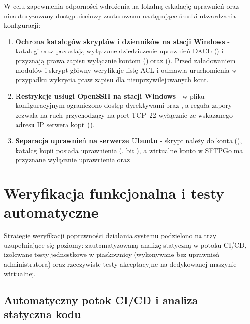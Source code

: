W celu zapewnienia odporności wdrożenia na lokalną eskalację uprawnień oraz nieautoryzowany dostęp sieciowy zastosowano następujące środki utwardzania konfiguracji:
\begin{enumerate}
    \item \textbf{Ochrona katalogów skryptów i dzienników na stacji Windows} - katalogi  oraz  posiadają wyłączone dziedziczenie uprawnień DACL () i przyznają prawa zapisu wyłącznie kontom  () oraz  (). Przed załadowaniem modułów  i  skrypt główny weryfikuje listę ACL i odmawia uruchomienia w przypadku wykrycia praw zapisu dla nieuprzywilejowanych kont.
    \item \textbf{Restrykcje usługi OpenSSH na stacji Windows} - w pliku konfiguracyjnym  ograniczono dostęp dyrektywami  oraz , a reguła zapory  zezwala na ruch przychodzący na port TCP~22 wyłącznie ze wskazanego adresu IP serwera kopii ().
    \item \textbf{Separacja uprawnień na serwerze Ubuntu} - skrypt  należy do konta  (), katalog kopii  posiada uprawnienia  (, bit ), a wirtualne konto  w SFTPGo ma przyznane wyłącznie uprawnienia  oraz .
\end{enumerate}

\section{Weryfikacja funkcjonalna i testy automatyczne}\label{sec:testy-weryfikacja}

Strategię weryfikacji poprawności działania systemu podzielono na trzy uzupełniające się poziomy: zautomatyzowaną analizę statyczną w potoku CI/CD, izolowane testy jednostkowe w piaskownicy (wykonywane bez uprawnień administratora) oraz rzeczywiste testy akceptacyjne na dedykowanej maszynie wirtualnej.

\subsection{Automatyczny potok CI/CD i analiza statyczna kodu}\label{subsec:potok-ci-cd}


